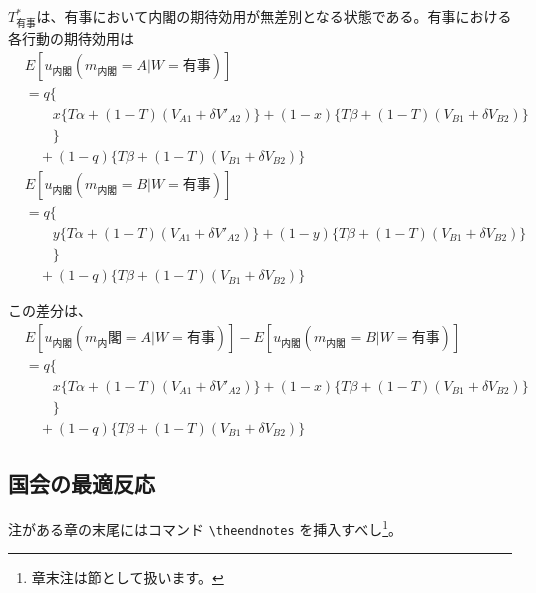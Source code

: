 \documentclass[main.tex]{subfiles}
\begin{document}
$T^*_{有事}$は、有事において内閣の期待効用が無差別となる状態である。有事における各行動の期待効用は
\begin{align*}
    & E[u_{内閣}(m_{内閣}=A|W=有事)]\\
    & = q\lbrace \\
    & \quad\quad x \lbrace T\alpha + (1-T)(V_{A1} + \delta V'_{A2}) \rbrace + (1-x)\lbrace T\beta + (1-T)(V_{B1} + \delta V_{B2}) \rbrace \\
    & \quad\quad \rbrace\\
    & \quad +(1-q)\lbrace T\beta + (1-T)(V_{B1} + \delta V_{B2}) \rbrace
\end{align*}
\begin{align*}
    & E[u_{内閣}(m_{内閣}=B|W=有事)]\\
    & = q\lbrace \\
    & \quad\quad y \lbrace T\alpha + (1-T)(V_{A1} + \delta V'_{A2}) \rbrace + (1-y)\lbrace T\beta + (1-T)(V_{B1} + \delta V_{B2}) \rbrace \\
    & \quad\quad \rbrace\\
    & \quad +(1-q)\lbrace T\beta + (1-T)(V_{B1} + \delta V_{B2}) \rbrace
\end{align*}

この差分は、
\begin{align*}
    & E[u_{内閣}(m_内閣=A|W=有事)] - E[u_{内閣}(m_{内閣}=B|W=有事)]\\
    & = q\lbrace \\
    & \quad\quad x \lbrace T\alpha + (1-T)(V_{A1} + \delta V'_{A2}) \rbrace + (1-x)\lbrace T\beta + (1-T)(V_{B1} + \delta V_{B2}) \rbrace \\
    & \quad\quad \rbrace\\
    & \quad +(1-q)\lbrace T\beta + (1-T)(V_{B1} + \delta V_{B2}) \rbrace
\end{align*}





\subsection{国会の最適反応}





\theendnotes %

注がある章の末尾にはコマンド \verb#\theendnotes# を挿入すべし\footnote{章末注は節として扱います。}。


\theendnotes %
\end{document}
